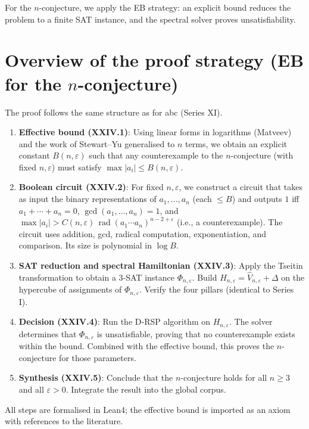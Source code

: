 \documentclass[11pt,a4paper]{article}
\begin{document}
For the $n$-conjecture, we apply the EB strategy: an explicit bound reduces the problem to a finite SAT instance, and the spectral solver proves unsatisfiability.

\section{Overview of the proof strategy (EB for the $n$-conjecture)}

The proof follows the same structure as for abc (Series XI).

\begin{enumerate}
\item \textbf{Effective bound (XXIV.1)}: Using linear forms in logarithms (Matveev) and the work of Stewart–Yu generalised to $n$ terms, we obtain an explicit constant $B(n,\varepsilon)$ such that any counterexample to the $n$-conjecture (with fixed $n,\varepsilon$) must satisfy $\max |a_i| \le B(n,\varepsilon)$.
\item \textbf{Boolean circuit (XXIV.2)}: For fixed $n,\varepsilon$, we construct a circuit that takes as input the binary representations of $a_1,\dots,a_n$ (each $\le B$) and outputs $1$ iff $a_1+\cdots+a_n=0$, $\gcd(a_1,\dots,a_n)=1$, and $\max |a_i| > C(n,\varepsilon)\,\operatorname{rad}(a_1\cdots a_n)^{n-2+\varepsilon}$ (i.e., a counterexample). The circuit uses addition, gcd, radical computation, exponentiation, and comparison. Its size is polynomial in $\log B$.
\item \textbf{SAT reduction and spectral Hamiltonian (XXIV.3)}: Apply the Tseitin transformation to obtain a 3‑SAT instance $\Phi_{n,\varepsilon}$. Build $H_{n,\varepsilon} = \hat{V}_{n,\varepsilon} + \Delta$ on the hypercube of assignments of $\Phi_{n,\varepsilon}$. Verify the four pillars (identical to Series I).
\item \textbf{Decision (XXIV.4)}: Run the D‑RSP algorithm on $H_{n,\varepsilon}$. The solver determines that $\Phi_{n,\varepsilon}$ is unsatisfiable, proving that no counterexample exists within the bound. Combined with the effective bound, this proves the $n$-conjecture for those parameters.
\item \textbf{Synthesis (XXIV.5)}: Conclude that the $n$-conjecture holds for all $n\ge 3$ and all $\varepsilon>0$. Integrate the result into the global corpus.
\end{enumerate}

All steps are formalised in Lean4; the effective bound is imported as an axiom with references to the literature.
\end{document}
